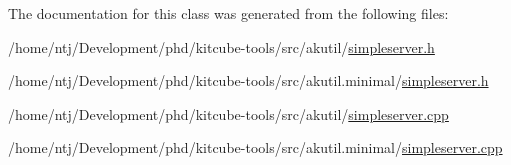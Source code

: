 The documentation for this class was generated from the following files\-:\begin{DoxyCompactItemize}
\item 
/home/ntj/\-Development/phd/kitcube-\/tools/src/akutil/\hyperlink{simpleserver_8h}{simpleserver.\-h}\item 
/home/ntj/\-Development/phd/kitcube-\/tools/src/akutil.\-minimal/\hyperlink{minimal_2simpleserver_8h}{simpleserver.\-h}\item 
/home/ntj/\-Development/phd/kitcube-\/tools/src/akutil/\hyperlink{simpleserver_8cpp}{simpleserver.\-cpp}\item 
/home/ntj/\-Development/phd/kitcube-\/tools/src/akutil.\-minimal/\hyperlink{minimal_2simpleserver_8cpp}{simpleserver.\-cpp}\end{DoxyCompactItemize}
